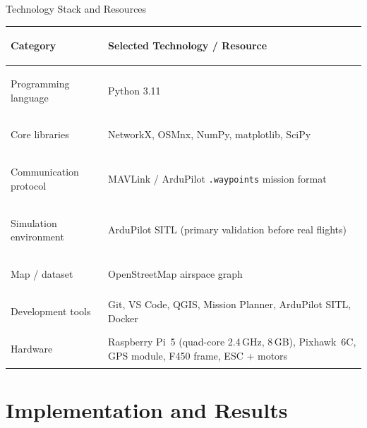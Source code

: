 \documentclass[aspectratio=169,11pt]{beamer}
\begin{document}
\begin{frame}{Technology Stack and Resources}
  \small
  \begin{tabularx}{\textwidth}{>{\bfseries\raggedright\arraybackslash}p{3.2cm}Y}
    \toprule
    Category & Selected Technology / Resource\\
    \midrule
    Programming language  & Python 3.11\\
    Core libraries        & NetworkX, OSMnx, NumPy, matplotlib, SciPy\\
    Communication protocol & MAVLink / ArduPilot \texttt{.waypoints}
                             mission format\\
    Simulation environment & ArduPilot SITL (primary validation before
                             real flights)\\
    Map / dataset          & OpenStreetMap airspace graph\\
    Development tools      & Git, VS Code, QGIS, Mission Planner,
                             ArduPilot SITL, Docker\\
    Hardware               & Raspberry Pi~5 (quad-core 2.4\,GHz, 8\,GB),
                             Pixhawk~6C, GPS module, F450 frame,
                             ESC + motors\\
    \bottomrule
  \end{tabularx}
\end{frame}

\section{Implementation and Results}
\end{document}
